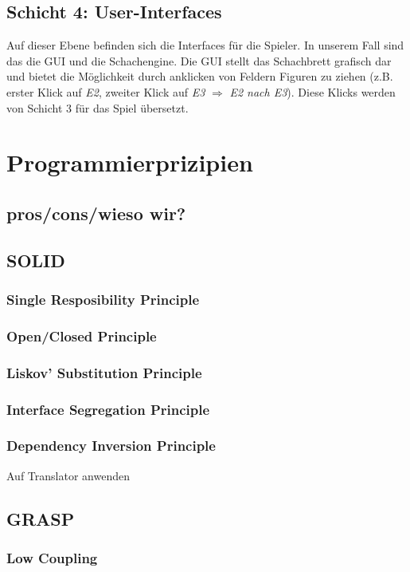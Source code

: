 \documentclass[
10pt, %
a4paper, %
oneside, %
headinclude,footinclude, %
BCOR5mm, %
]{scrartcl}
\begin{document}
\subsection{Schicht 4: User-Interfaces}
Auf dieser Ebene befinden sich die Interfaces für die Spieler. In unserem Fall sind das die GUI und die Schachengine. %
Die GUI stellt das Schachbrett grafisch dar und bietet die Möglichkeit durch anklicken von Feldern Figuren zu ziehen (z.B. erster Klick auf \textit{E2}, zweiter Klick auf \textit{E3} $\Rightarrow$ \textit{E2 nach E3}). Diese Klicks werden von Schicht 3 für das Spiel übersetzt.

\section{Programmierprizipien}
\subsection{pros/cons/wieso wir?}
\subsection{SOLID}
\subsubsection{Single Resposibility Principle}
\subsubsection{Open/Closed Principle}
\subsubsection{Liskov' Substitution Principle}
\subsubsection{Interface Segregation Principle}
\subsubsection{Dependency Inversion Principle}
Auf Translator anwenden
\subsection{GRASP}
\subsubsection{Low Coupling}
\end{document}
